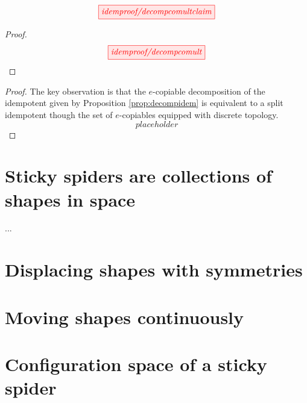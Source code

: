 \begin{fullwidth}
\begin{proposition}\label{prop:decompcomult}
\[\scalebox{1}{\tikzfig{idemproof/decompcomultclaim}}\]
\begin{proof}
\[\scalebox{1}{\tikzfig{idemproof/decompcomult}}\]
\end{proof}
\end{proposition}

\begin{proof}
The key observation is that the $e$-copiable decomposition of the idempotent given by Proposition \ref{prop:decompidem} is equivalent to a split idempotent though the set of $e$-copiables equipped with discrete topology.
\[placeholder\]

\end{proof}

\end{fullwidth}

\section{Sticky spiders are collections of shapes in space}

...

\section{Displacing shapes with symmetries}

\begin{defn}

\end{defn}

\begin{defn}

\end{defn}

\section{Moving shapes continuously}

\section{Configuration space of a sticky spider}

\begin{defn}

\end{defn}

